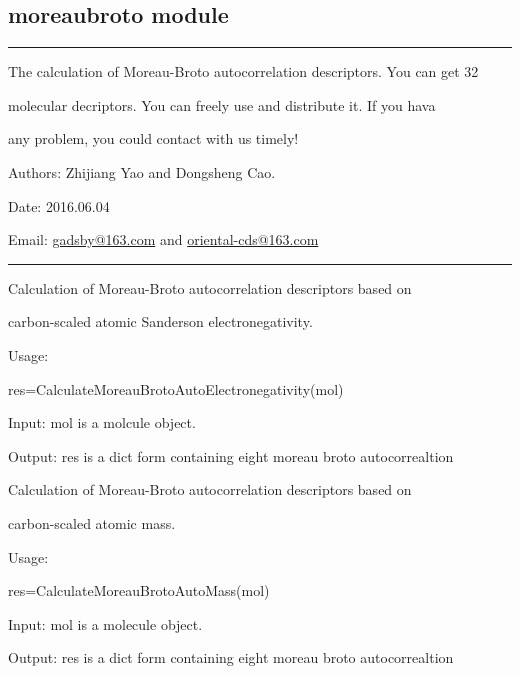 \documentclass[letterpaper,10pt,english]{sphinxmanual}
\begin{document}
\subsection{moreaubroto module}
\label{reference/moreaubroto::doc}\label{reference/moreaubroto:moreaubroto-module}\label{reference/moreaubroto:module-moreaubroto}

\bigskip\hrule{}\bigskip


The calculation of Moreau-Broto autocorrelation descriptors. You can get 32

molecular decriptors. You can freely use and distribute it. If you hava

any problem, you could contact with us timely!

Authors: Zhijiang Yao and Dongsheng Cao.

Date: 2016.06.04

Email: \href{mailto:gadsby@163.com}{gadsby@163.com} and \href{mailto:oriental-cds@163.com}{oriental-cds@163.com}


\bigskip\hrule{}\bigskip


\begin{fulllineitems}
\label{reference/moreaubroto:moreaubroto.CalculateMoreauBrotoAutoElectronegativity}
Calculation of Moreau-Broto autocorrelation descriptors based on

carbon-scaled atomic Sanderson electronegativity.

Usage:

res=CalculateMoreauBrotoAutoElectronegativity(mol)

Input: mol is a molcule object.

Output: res is a dict form containing eight moreau broto autocorrealtion

\end{fulllineitems}


\begin{fulllineitems}
\label{reference/moreaubroto:moreaubroto.CalculateMoreauBrotoAutoMass}
Calculation of Moreau-Broto autocorrelation descriptors based on

carbon-scaled atomic mass.

Usage:

res=CalculateMoreauBrotoAutoMass(mol)

Input: mol is a molecule object.

Output: res is a dict form containing eight moreau broto autocorrealtion

\end{fulllineitems}
\end{document}

